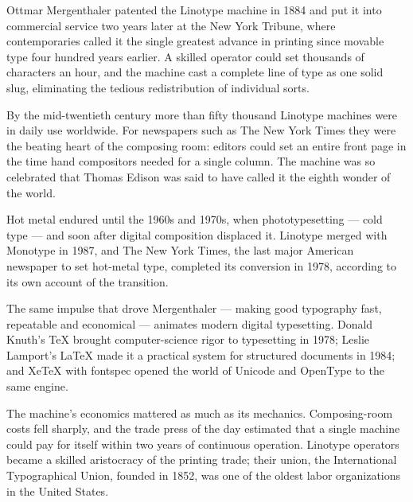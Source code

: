 \documentclass{linotype}
\begin{document}
\begin{plate}
\begin{storycolumns}
\noindent Ottmar Mergenthaler patented the Linotype machine in 1884 and put it into commercial service two years later at the New York Tribune, where contemporaries called it the single greatest advance in printing since movable type four hundred years earlier. A skilled operator could set thousands of characters an hour, and the machine cast a complete line of type as one solid slug, eliminating the tedious redistribution of individual sorts.

By the mid-twentieth century more than fifty thousand Linotype machines were in daily use worldwide. For newspapers such as The New York Times they were the beating heart of the composing room: editors could set an entire front page in the time hand compositors needed for a single column. The machine was so celebrated that Thomas Edison was said to have called it the eighth wonder of the world.

Hot metal endured until the 1960s and 1970s, when phototypesetting — cold type — and soon after digital composition displaced it. Linotype merged with Monotype in 1987, and The New York Times, the last major American newspaper to set hot-metal type, completed its conversion in 1978, according to its own account of the transition.

The same impulse that drove Mergenthaler — making good typography fast, repeatable and economical — animates modern digital typesetting. Donald Knuth's TeX brought computer-science rigor to typesetting in 1978; Leslie Lamport's LaTeX made it a practical system for structured documents in 1984; and XeTeX with fontspec opened the world of Unicode and OpenType to the same engine.

The machine's economics mattered as much as its mechanics. Composing-room costs fell sharply, and the trade press of the day estimated that a single machine could pay for itself within two years of continuous operation. Linotype operators became a skilled aristocracy of the printing trade; their union, the International Typographical Union, founded in 1852, was one of the oldest labor organizations in the United States.


\end{storycolumns}
\end{plate}
\end{document}
